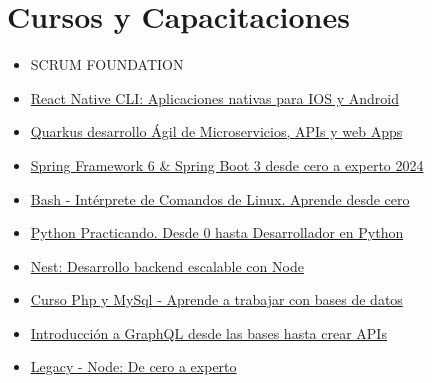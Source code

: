 \documentclass[%
               doublesided,
               paper=a4,
               fontsize=10pt
              ]{my-resume}
\begin{document}
{    \vspace{0.5em}


    \section[\faMortarBoard]{Cursos y Capacitaciones}

    \begin{itemize}
        \item SCRUM  FOUNDATION
        \item \href{https://www.udemy.com/certificate/UC-72d37b5e-f6b1-4346-b48b-da8062da9fc2/}{React Native CLI: Aplicaciones nativas para IOS y Android}
        \item \href{https://www.udemy.com/certificate/UC-08e33a74-fe18-4b66-b855-c722fd4b60b5/}{Quarkus desarrollo Ágil de Microservicios, APIs y web Apps}
        \item \href{https://www.udemy.com/certificate/UC-3ba974b6-9611-43ce-bcd8-a3e0896c454c/}{Spring Framework 6 & Spring Boot 3 desde cero a experto 2024}
        \item \href{https://www.udemy.com/certificate/UC-494134ba-fddf-4892-ab44-9e7627dd8381/}{Bash - Intérprete de Comandos de Linux. Aprende desde cero}
        \item \href{https://www.udemy.com/certificate/UC-a3994fa4-c958-449c-9557-a70f97487448/}{Python Practicando. Desde 0 hasta Desarrollador en Python}
        \item \href{https://www.udemy.com/certificate/UC-a1c57b58-3e16-4268-a4f6-c532e89323d2/}{Nest: Desarrollo backend escalable con Node}
        \item \href{https://www.udemy.com/certificate/UC-569fd0eb-1c71-449c-ab0f-694ef4d4b93a/}{Curso Php y MySql - Aprende a trabajar con bases de datos}
        \item \href{https://www.udemy.com/certificate/UC-22c55a40-4bc7-4704-ac0d-83bf64eb1c91/}{Introducción a GraphQL desde las bases hasta crear APIs}
        \item \href{https://www.udemy.com/certificate/UC-fc478c3c-e4f3-4796-8cb8-c2e9e80228a5/}{Legacy - Node: De cero a experto}
    \end{itemize}

}
\makebody
\clearpage


\pagestyle{highlightmain}
\end{document}
